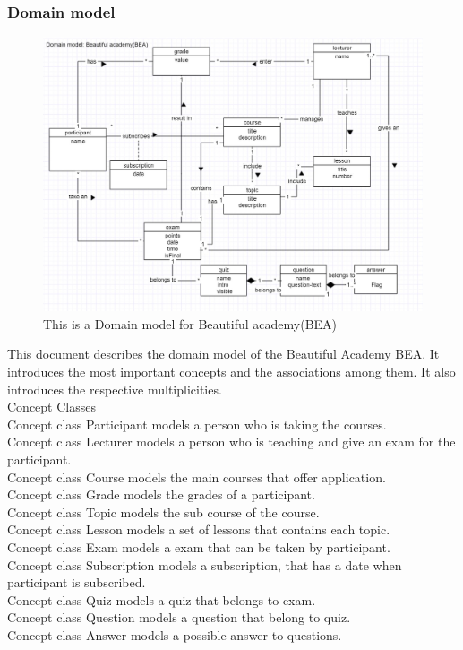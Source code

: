 \documentclass{scrartcl}
\begin{document}
\subsubsection{Domain model}  
\begin{figure}[h]
\centering
\includegraphics[width=150mm]{domain-in-use.JPG}
\caption{This is a Domain model for Beautiful academy(BEA)}
\label{Life Cycle Models}
\end{figure}

This document describes the domain model of the Beautiful Academy BEA. It introduces the most important concepts and the associations among them. It also introduces the respective multiplicities. \\

Concept Classes \\

Concept class Participant models a person who is taking the courses. \\
Concept class Lecturer models a person who is teaching and give an exam for the participant.\\
Concept class Course models the main courses that offer application.\\
Concept class Grade models the grades of a participant.\\
Concept class Topic models the sub course of the course.\\
Concept class Lesson models a set of lessons that contains each topic.\\
Concept class Exam models a exam that can be taken by participant.\\
Concept class Subscription models a subscription, that has a date when participant is subscribed.\\
Concept class Quiz models a quiz that belongs to exam.\\
Concept class Question models a question that belong to quiz.\\
Concept class Answer models a possible answer to questions.\\
\end{document}
